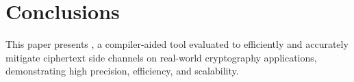 \section{Conclusions}
\label{sec:conclusion}

This paper presents \tool, a compiler-aided tool evaluated to efficiently and accurately mitigate ciphertext side channels on real-world cryptography applications, demonstrating high precision, efficiency, and scalability.
